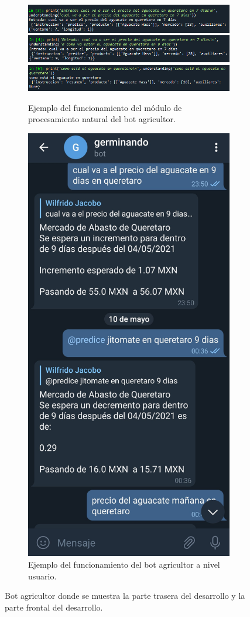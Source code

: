 \begin{figure}[h]
	\centering
	\begin{subfigure}{0.45\linewidth}
		\centering
		\includegraphics[width=0.9\linewidth]{img/naturalbot1}
		\includegraphics[width=0.9\linewidth]{img/naturalbot2}
		\includegraphics[width=0.9\linewidth]{img/naturalbot3}
		\caption{Ejemplo del funcionamiento del módulo de procesamiento natural del bot agricultor.}
		\label{fig:natbot1}
	\end{subfigure}
	\begin{subfigure}{0.45\linewidth}
		\centering
		\includegraphics[width=0.45\linewidth]{img/germinandobot}
		\caption{Ejemplo del funcionamiento del bot agricultor a nivel usuario.}
		\label{fig:natbot2}
	\end{subfigure}
	\caption{Bot agricultor donde se muestra la parte trasera del desarrollo y la parte frontal del desarrollo. }
	\label{fig:naturalbot}
\end{figure}


